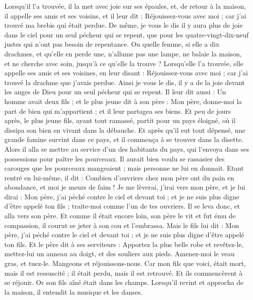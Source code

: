 \begin{multicols}{2}
{Lorsqu’il l’a trouvée, il la met avec joie sur ses épaules,
et, de retour à la maison, il appelle ses amis et ses voisins, et il leur dit : Réjouissez-vous avec moi ; car j'ai trouvé ma brebis qui était perdue.
De même, je vous le dis il y aura plus de joie dans le ciel pour un seul pécheur qui se repent, que pour les quatre-vingt-dix-neuf justes qui n'ont pas besoin de repentance.
\TextTitle{[grandeur]}
Ou quelle femme, si elle a dix drachmes, et qu’elle en perde une, n'allume pas une lampe, ne balaie la maison, et ne cherche avec soin, jusqu'à ce qu'elle la trouve ?
Lorsqu’elle l’a trouvée, elle appelle ses amis et ses voisines, en leur disant : Réjouissez-vous avec moi ; car j'ai trouvé la drachme que j'avais perdue.
Ainsi je vous le dis, il y a de la joie devant les anges de Dieu pour un seul pécheur qui se repent.
\TextTitle{[grandeur]}
Il leur dit aussi : Un homme avait deux fils ;
et le plus jeune dit à son père : Mon père, donne-moi la part de bien qui m'appartient ; et il leur partagea ses biens.
Et peu de jours après, le plus jeune fils, ayant tout ramassé, partit pour un pays éloigné, où il dissipa son bien en vivant dans la débauche.
Et après qu'il eut tout dépensé, une grande famine survint dans ce pays, et il commença à se trouver dans la disette.
Alors il alla se mettre au service d'un des habitants du pays, qui l'envoya dans ses possessions pour paître les pourceaux.
Il aurait bien voulu se rassasier des carouges que les pourceaux mangeaient ; mais personne ne lui en donnait.
Etant rentré en lui-même, il dit : Combien d’ouvriers chez mon père ont du pain en abondance, et moi je meurs de faim !
Je me lèverai, j’irai vers mon père, et je lui dirai : Mon père, j'ai péché contre le ciel et devant toi ;
et je ne suis plus digne d'être appelé ton fils ; traite-moi comme l'un de tes ouvriers.
Il se leva donc, et alla vers son père. Et comme il était encore loin, son père le vit et fut ému de compassion, il courut se jeter à son cou et l’embrassa.
Mais le fils lui dit : Mon père, j'ai péché contre le ciel et devant toi ; et je ne suis plus digne d'être appelé ton fils.
Et le père dit à ses serviteurs : Apportez la plus belle robe et revêtez-le, mettez-lui un anneau au doigt, et des souliers aux pieds.
Amenez-moi le veau gras, et tuez-le. Mangeons et réjouissons-nous.
Car mon fils que voici, était mort, mais il est ressuscité ; il était perdu, mais il est retrouvé. Et ils commencèrent à se réjouir.
Or son fils aîné était dans les champs. Lorsqu’il revint et approcha de la maison, il entendit la musique et les danses.
}
\end{multicols}
